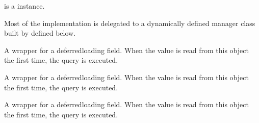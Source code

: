 \documentclass[letterpaper,10pt,english]{sphinxmanual}
\begin{document}
\begin{fulllineitems}
\begin{fulllineitems}
\sphinxAtStartPar
{} is a  instance.

\sphinxAtStartPar
Most of the implementation is delegated to a dynamically defined manager
class built by  defined below.

\end{fulllineitems}


\begin{fulllineitems}
\label{\detokenize{courses:id10}}
\pysigstartsignatures
\pysigline
{}
\pysigstopsignatures
\sphinxAtStartPar
A wrapper for a deferred\sphinxhyphen{}loading field. When the value is read from this
object the first time, the query is executed.

\end{fulllineitems}


\begin{fulllineitems}
\label{\detokenize{courses:id11}}
\pysigstartsignatures
\pysigline
{}
\pysigstopsignatures
\sphinxAtStartPar
A wrapper for a deferred\sphinxhyphen{}loading field. When the value is read from this
object the first time, the query is executed.

\end{fulllineitems}


\begin{fulllineitems}
\label{\detokenize{courses:courses.models.Lesson.updated_at}}
\pysigstartsignatures
\pysigline
{}
\pysigstopsignatures
\sphinxAtStartPar
A wrapper for a deferred\sphinxhyphen{}loading field. When the value is read from this
object the first time, the query is executed.

\end{fulllineitems}



\end{fulllineitems}
\end{document}
